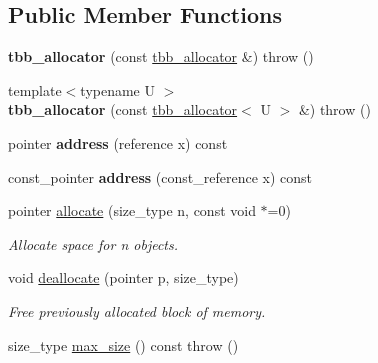\subsection*{Public Member Functions}
\begin{DoxyCompactItemize}
\item 
\hypertarget{classtbb_1_1tbb__allocator_a8371538bc959f41f342012e363564aed}{}{\bfseries tbb\+\_\+allocator} (const \hyperlink{classtbb_1_1tbb__allocator}{tbb\+\_\+allocator} \&)  throw ()\label{classtbb_1_1tbb__allocator_a8371538bc959f41f342012e363564aed}

\item 
\hypertarget{classtbb_1_1tbb__allocator_a9faff9ae2c2cd3ed2ca064b562224974}{}{\footnotesize template$<$typename U $>$ }\\{\bfseries tbb\+\_\+allocator} (const \hyperlink{classtbb_1_1tbb__allocator}{tbb\+\_\+allocator}$<$ U $>$ \&)  throw ()\label{classtbb_1_1tbb__allocator_a9faff9ae2c2cd3ed2ca064b562224974}

\item 
\hypertarget{classtbb_1_1tbb__allocator_ac1370dbb1f06fed57273bddcae688255}{}pointer {\bfseries address} (reference x) const \label{classtbb_1_1tbb__allocator_ac1370dbb1f06fed57273bddcae688255}

\item 
\hypertarget{classtbb_1_1tbb__allocator_afb9c91d548d4a5affe3ec1de1c1b9327}{}const\+\_\+pointer {\bfseries address} (const\+\_\+reference x) const \label{classtbb_1_1tbb__allocator_afb9c91d548d4a5affe3ec1de1c1b9327}

\item 
\hypertarget{classtbb_1_1tbb__allocator_afedd8a64eed9692083c708f419338e0c}{}pointer \hyperlink{classtbb_1_1tbb__allocator_afedd8a64eed9692083c708f419338e0c}{allocate} (size\+\_\+type n, const void $\ast$=0)\label{classtbb_1_1tbb__allocator_afedd8a64eed9692083c708f419338e0c}

\begin{DoxyCompactList}\small\item\em Allocate space for n objects. \end{DoxyCompactList}\item 
\hypertarget{classtbb_1_1tbb__allocator_a28e333e0fff56dd53c20b82cfee430ab}{}void \hyperlink{classtbb_1_1tbb__allocator_a28e333e0fff56dd53c20b82cfee430ab}{deallocate} (pointer p, size\+\_\+type)\label{classtbb_1_1tbb__allocator_a28e333e0fff56dd53c20b82cfee430ab}

\begin{DoxyCompactList}\small\item\em Free previously allocated block of memory. \end{DoxyCompactList}\item 
\hypertarget{classtbb_1_1tbb__allocator_a0a2676fb8a2f931961d373b88848c93e}{}size\+\_\+type \hyperlink{classtbb_1_1tbb__allocator_a0a2676fb8a2f931961d373b88848c93e}{max\+\_\+size} () const   throw ()\label{classtbb_1_1tbb__allocator_a0a2676fb8a2f931961d373b88848c93e}


\end{DoxyCompactItemize}

